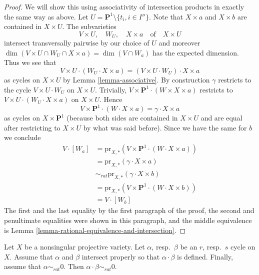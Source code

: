 \begin{proof}
\medskip\noindent
We will show this using associativity of intersection products in exactly
the same way as above. Let $U = \mathbf{P}^1 \setminus \{t_i, i \in I''\}$.
Note that $X \times a$ and $X \times b$ are contained in $X \times U$.
The subvarieties
$$
V \times U,\quad W_U,\quad X \times a\quad\text{of}\quad X \times U
$$
intersect transversally pairwise by our choice of $U$ and moreover
$\dim(V \times U \cap W_U \cap X \times a) = \dim(V \cap W_a)$ has
the expected dimension. Thus we see that
$$
V \times U \cdot (W_U \cdot X \times a) =
(V \times U \cdot W_U) \cdot X \times a
$$
as cycles on $X \times U$ by Lemma \ref{lemma-associative}.
By construction $\gamma$ restricts to the cycle $V \times U \cdot W_U$
on $X \times U$. Trivially,
$V \times \mathbf{P}^1 \cdot (W \times X \times a)$ restricts
to $V \times U \cdot (W_U \cdot X \times a)$ on $X \times U$.
Hence
$$
V \times \mathbf{P}^1 \cdot (W \cdot X \times a) =
\gamma \cdot X \times a
$$
as cycles on $X \times \mathbf{P}^1$ (because both sides
are contained in $X \times U$ and are equal after restricting
to $X \times U$ by what was said before). Since we have the same for $b$
we conclude
\begin{align*}
V \cdot [W_a]
& =
\text{pr}_{X,*}(V \times \mathbf{P}^1 \cdot (W \cdot X\times a)) \\
& =
\text{pr}_{X, *}(\gamma \cdot X \times a) \\
& \sim_{rat} 
\text{pr}_{X, *}(\gamma \cdot X \times b) \\
& =
\text{pr}_{X,*}(V \times \mathbf{P}^1 \cdot (W \cdot X\times b)) \\
& =
V \cdot [W_b]
\end{align*}
The first and the last equality by the first paragraph of the proof,
the second and penultimate equalities were shown in this paragraph, and
the middle equivalence is
Lemma \ref{lemma-rational-equivalence-and-intersection}.
\end{proof}

\begin{theorem}
\label{theorem-well-defined}
Let $X$ be a nonsingular projective variety. Let $\alpha$, resp.\ $\beta$
be an $r$, resp.\ $s$ cycle on $X$. Assume that $\alpha$ and $\beta$
intersect properly so that $\alpha \cdot \beta$ is defined. Finally,
assume that $\alpha \sim_{rat} 0$. Then $\alpha \cdot \beta \sim_{rat} 0$.
\end{theorem}

